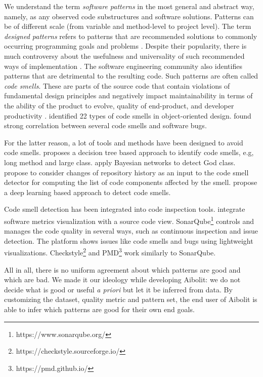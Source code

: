 We understand the term \textit{software patterns} in the most general and
abstract way, namely, as any observed code substructures and software solutions.
Patterns can be of different scale (from variable and method-level to project
level). The term \textit{designed patterns} refers to patterns that are
recommended solutions to commonly occurring programming goals and problems
\citep{gamma1995design}. Despite their popularity, there is much controversy about the
usefulness and universality of such recommended ways of implementation
\citep{mcconnell2004code}. The software engineering community
also identifies patterns that are detrimental to the resulting code. Such
patterns are often called \textit{code smells}. These are parts of the
source code that contain violations of  fundamental design principles
and negatively impact maintainability in terms of the
ability of the product to evolve, quality  of end-product, and developer
productivity \citet{Reeshti2019MeasuringCS}. \citet{Din2012AntipatternsDA}
identified 22 types of  code smells in object-oriented
design. \citet{Kessentini2019UnderstandingTC} found strong correlation  between
several code smells and software bugs.

For the latter reason, a lot of tools and methods have been designed to avoid
code smells. \citet{Kreimer2005AdaptiveDO}  proposes a decision tree based
approach to identify code smells, e.g, long method  and large class.
\citet{Vaucher2009TrackingDS} apply Bayesian  networks to detect God class.
\citet{Palomba2015MiningVH} propose  to consider changes of repository history
as an input to the code smell detector  for computing the list of code
components affected by the smell. \citet{Liu2019DeepLB} propose a deep learning
based approach  to detect code smells.

Code smell detection has been integrated into code inspection tools.
\citet{MurphyHill2010AnIA} integrate software metrics  visualization with a
source code view.  SonarQube\footnote{https://www.sonarqube.org/} controls and
manages  the code quality in several ways, such as continuous  inspection and
issue detection. The platform shows issues like code smells and bugs using
lightweight visualizations.
Checkstyle\footnote{https://checkstyle.sourceforge.io/} and
PMD\footnote{https://pmd.github.io/}  work similarly to SonarQube.


All in all, there is no uniform agreement about which patterns are good and
which are bad. We made it our ideology while developing Aibolit: we do not
decide what is good or useful \textit{a priori} but let it be inferred from
data. By customizing the dataset, quality metric and pattern set, the end user
of Aibolit is able to infer which patterns are good for their own end goals.
